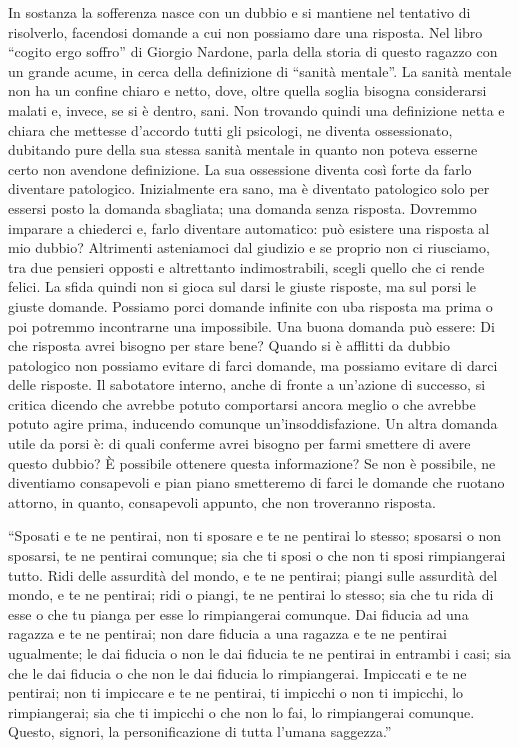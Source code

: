 \documentclass[12pt]{book} %
\begin{document}
In sostanza la sofferenza nasce con un dubbio e si mantiene nel tentativo di risolverlo, facendosi domande a cui non
possiamo dare una risposta. Nel libro “cogito ergo soffro” di Giorgio
Nardone, parla della storia di questo ragazzo con un grande acume, in cerca della definizione di “sanità mentale”. La
sanità mentale non ha un confine chiaro e netto, dove, oltre quella soglia bisogna considerarsi malati e, invece, se si
è dentro, sani. Non trovando quindi una definizione netta e chiara che mettesse d'accordo tutti
gli psicologi, ne diventa ossessionato, dubitando pure della sua stessa sanità mentale in quanto non poteva esserne
certo non avendone definizione. La sua ossessione diventa così forte da farlo diventare patologico. Inizialmente era
sano, ma è diventato patologico solo per essersi posto la domanda sbagliata; una domanda senza risposta. Dovremmo
imparare a chiederci e, farlo diventare automatico: può esistere una risposta al mio dubbio? Altrimenti asteniamoci dal
giudizio e se proprio non ci riusciamo, tra due pensieri opposti e altrettanto indimostrabili, scegli quello che ci
rende felici. La sfida quindi non si gioca sul darsi le giuste risposte, ma sul porsi le giuste domande. Possiamo porci domande infinite con uba risposta ma prima o poi potremmo incontrarne una impossibile. Una
buona domanda può essere: Di che risposta avrei bisogno per stare bene? Quando si è afflitti da dubbio patologico non
possiamo evitare di farci domande, ma possiamo evitare di darci delle
risposte. Il sabotatore interno, anche di fronte a un'azione di successo, si critica dicendo che
avrebbe potuto comportarsi ancora meglio o che avrebbe potuto agire prima, inducendo comunque
un'insoddisfazione. Un altra domanda utile da porsi è: di quali conferme avrei bisogno per farmi
smettere di avere questo dubbio? È possibile ottenere questa informazione? Se non è possibile, ne diventiamo
consapevoli e pian piano smetteremo di farci le domande che ruotano attorno, in quanto, consapevoli appunto, che non
troveranno risposta. 

“Sposati e te ne pentirai, non ti sposare e te ne pentirai lo stesso; sposarsi o non sposarsi, te ne pentirai comunque;
sia che ti sposi o che non ti sposi rimpiangerai tutto. Ridi delle assurdità del mondo, e te ne pentirai; piangi sulle
assurdità del mondo, e te ne pentirai; ridi o piangi, te ne pentirai lo stesso; sia che tu rida di esse o che tu pianga
per esse lo rimpiangerai comunque. Dai fiducia ad una ragazza e te ne pentirai; non dare fiducia a una ragazza e te ne
pentirai ugualmente; le dai fiducia o non le dai fiducia te ne pentirai in entrambi i casi; sia che le dai fiducia o
che non le dai fiducia lo rimpiangerai. Impiccati e te ne pentirai; non ti impiccare e te ne pentirai, ti impicchi o
non ti impicchi, lo rimpiangerai; sia che ti impicchi o che non lo fai, lo rimpiangerai comunque. Questo, signori, la
personificazione di tutta l'umana saggezza.”
\end{document}
